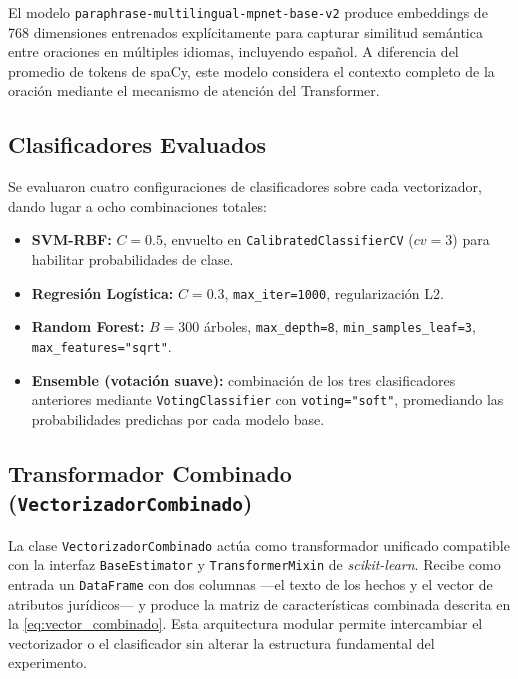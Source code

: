 El modelo \texttt{paraphrase-multilingual-mpnet-base-v2}\cite{reimers2019} produce
embeddings de 768 dimensiones entrenados explícitamente para capturar
similitud semántica entre oraciones en múltiples idiomas, incluyendo
español. A diferencia del promedio de tokens de spaCy, este modelo
considera el contexto completo de la oración mediante el mecanismo de
atención del Transformer.

\subsection{Clasificadores Evaluados}
\label{subsec:clasificadores}

Se evaluaron cuatro configuraciones de clasificadores sobre cada
vectorizador, dando lugar a ocho combinaciones totales:

\begin{itemize}
  \item \textbf{SVM-RBF:} $C = 0.5$, envuelto en
        \texttt{CalibratedClassifierCV} ($cv=3$) para habilitar
        probabilidades de clase.
  \item \textbf{Regresión Logística:} $C = 0.3$,
        \texttt{max\_iter=1000}, regularización L2.
  \item \textbf{Random Forest:} $B = 300$ árboles,
        \texttt{max\_depth=8}, \texttt{min\_samples\_leaf=3},
        \texttt{max\_features="sqrt"}.
  \item \textbf{Ensemble (votación suave):} combinación de los tres
        clasificadores anteriores mediante \texttt{VotingClassifier}
        con \texttt{voting="soft"}, promediando las probabilidades
        predichas por cada modelo base.
\end{itemize}

\subsection{Transformador Combinado (\texttt{VectorizadorCombinado})}
\label{subsec:vectorizador_combinado}

La clase \texttt{VectorizadorCombinado} actúa como transformador unificado
compatible con la interfaz \texttt{BaseEstimator} y \texttt{TransformerMixin}
de \textit{scikit-learn}. Recibe como entrada un \texttt{DataFrame} con dos
columnas —el texto de los hechos y el vector de atributos jurídicos— y
produce la matriz de características combinada descrita en la
\cref{eq:vector_combinado}. Esta arquitectura modular permite intercambiar
el vectorizador o el clasificador sin alterar la estructura fundamental del
experimento.


